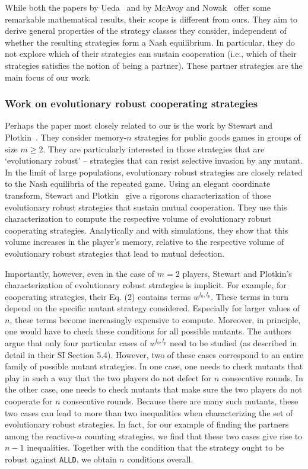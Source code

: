 \documentclass[9pt,twoside,lineno]{pnas-new}
\theoremstyle{plainCl1}
\theoremstyle{plainCl2}
\def\alld{\texttt{ALLD}}
\begin{document}
While both the papers by Ueda~\cite{ueda:RSOP:2021, Ueda:ORF:2022} and by McAvoy and Nowak~\cite{mcavoy:PRSA:2019} offer some remarkable mathematical results, their scope is different from ours.
They aim to derive general properties of the strategy classes they consider, independent of whether the resulting strategies form a Nash equilibrium. 
In particular, they do not explore which of their strategies can sustain cooperation (i.e., which of their strategies satisfies the notion of being a partner). These partner strategies are the main focus of our work. 

\subsubsection*{Work on evolutionary robust cooperating strategies}
Perhaps the paper most closely related to our is the work by Stewart and Plotkin~\cite{stewart:scientific:2016}. 
They consider memory-$n$ strategies for public goods games in groups of size $m\!\ge\!2$. 
They are particularly interested in those strategies that are `evolutionary robust' -- strategies that can resist selective invasion by any mutant. 
In the limit of large populations, evolutionary robust strategies are closely related to the Nash equilibria of the repeated game. 
Using an elegant coordinate transform, Stewart and Plotkin~\cite{stewart:scientific:2016} give a rigorous characterization of those evolutionary robust strategies that sustain mutual cooperation.
They use this characterization to compute the respective volume of evolutionary robust cooperating strategies.
Analytically and with simulations, they show that this volume increases in the player's memory, relative to the respective volume of evolutionary robust strategies that lead to mutual defection. 

Importantly,  however, even in the case of $m\!=\!2$ players, Stewart and Plotkin's characterization of evolutionary robust strategies is implicit.  
For example, for cooperating strategies, their Eq. (2) contains terms $w^{l_0,l_p}$. 
These terms in turn depend on the specific mutant strategy considered. 
Especially for larger values of $n$, these terms become increasingly expensive to compute. 
Moreover, in principle, one would have to check these conditions for all possible mutants. 
The authors argue that only four particular cases of  $w^{l_0,l_p}$ need to be studied (as described in detail in their SI Section 5.4).
However, two of these cases correspond to an entire family of possible mutant strategies. 
In one case, one needs to check mutants that play in such a way that the two players do not defect for $n$ consecutive rounds.  
In the other case, one needs to check mutants that make sure the two players do not cooperate for $n$ consecutive rounds. 
Because there are many such mutants, these two cases can lead to more than two inequalities when characterizing the set of evolutionary robust strategies. 
In fact, for our example of finding the partners among the reactive-$n$ counting strategies, we find that these two cases give rise to $n\!-\!1$ inequalities. 
Together with the condition that the strategy ought to be robust against \alld, we obtain $n$ conditions overall. 
\end{document}
